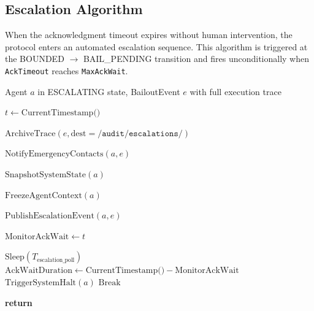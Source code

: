 \bigskip
\subsection{Escalation Algorithm}

When the acknowledgment timeout expires without human intervention, the protocol enters an automated escalation sequence. This algorithm is triggered at the BOUNDED $\rightarrow$ BAIL\_PENDING transition and fires unconditionally when \texttt{AckTimeout} reaches \texttt{MaxAckWait}.

\begin{algorithm}[H]
\caption{Escalation Algorithm}
\label{alg:escalation}
\begin{algorithmic}
\Require Agent $a$ in ESCALATING state, BailoutEvent $e$ with full execution trace

\State $t \gets \text{CurrentTimestamp()}$

\State $\text{ArchiveTrace}(e, \text{dest} = \texttt{/audit/escalations/})$

\State $\text{NotifyEmergencyContacts}(a, e)$

\State $\text{SnapshotSystemState}(a)$

\State $\text{FreezeAgentContext}(a)$

\State $\text{PublishEscalationEvent}(a, e)$

\State $\text{MonitorAckWait} \gets t$

    \State $\text{Sleep}(T_{\text{escalation\_poll}})$
    \State $\text{AckWaitDuration} \gets \text{CurrentTimestamp()} - \text{MonitorAckWait}$
        \State $\text{TriggerSystemHalt}(a)$
        \State $\text{Break}$
    \EndIf
\EndWhile

\State \textbf{return}
\end{algorithmic}
\end{algorithm}

